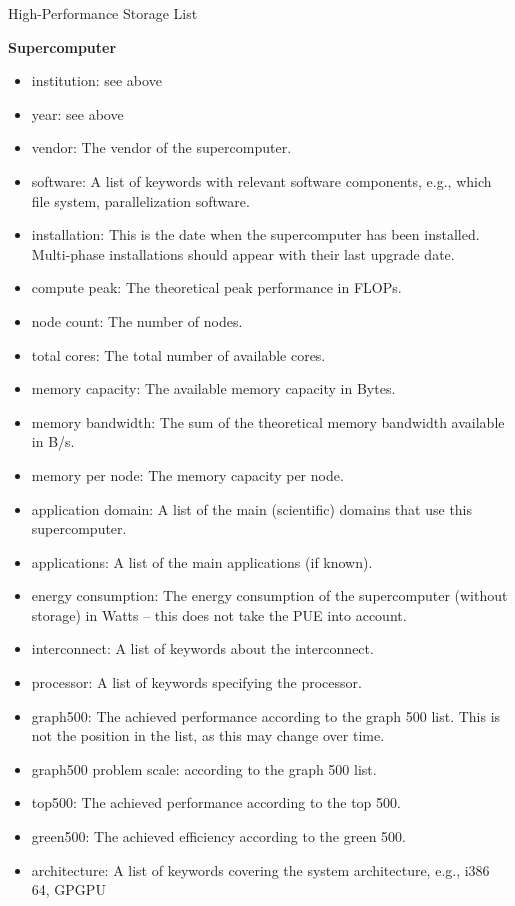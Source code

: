 \documentclass[portrait,a0paper,fontscale=0.4]{baposter}
\newcommand{\compresslist}{%
\setlength{\itemsep}{1pt}%
\setlength{\parskip}{0pt}%
\setlength{\parsep}{0pt}%
}
\begin{document}
\begin{poster}
\begin{posterbox}[name=schedule,column=1,span=2, below=concept]{High-Performance Storage List}
\begin{minipage}{0.48\textwidth}
\normalsize
\textbf{Supercomputer}
\scriptsize\begin{itemize}\compresslist
\item institution: see above
\item year:  see above
\item vendor: The vendor of the supercomputer.
\item software: A list of keywords with relevant software components, e.g., which file system, parallelization software.
\item installation: This is the date when the supercomputer has been installed. Multi-phase installations should appear with their last upgrade date.
\item compute peak: The theoretical peak performance in FLOPs.
\item node count: The number of nodes.
\item total cores: The total number of available cores.
\item memory capacity: The available memory capacity in Bytes.
\item memory bandwidth: The sum of the theoretical memory bandwidth available in B/s.
\item memory per node: The memory capacity per node.
\item application domain: A list of the main (scientific) domains that use this supercomputer.
\item applications: A list of the main applications (if known).
\item energy consumption: The energy consumption of the supercomputer (without storage) in Watts – this does not take the PUE into account.
\item interconnect: A list of keywords about the interconnect.
\item processor: A list of keywords specifying the processor.
\item graph500: The achieved performance according to the graph 500 list. This is not the position in the list, as this may change over time.
\item graph500 problem scale: according to the graph 500 list.
\item top500: The achieved performance according to the top 500.
\item green500: The achieved efficiency according to the green 500.
\item architecture: A list of keywords covering the system architecture, e.g., i386 64, GPGPU
\end{itemize}
\end{minipage}
\quad
\begin{minipage}{0.48\textwidth}



\end{minipage}
\end{posterbox}
\end{poster}
\end{document}
